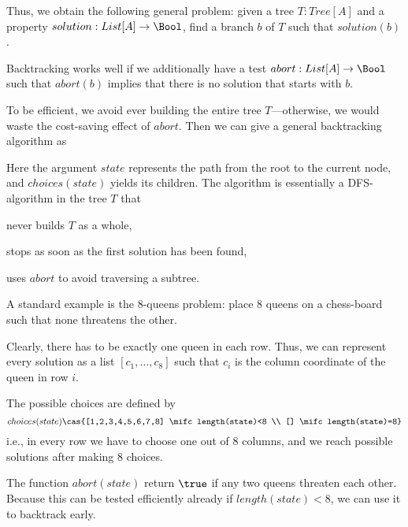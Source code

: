Thus, we obtain the following general problem: given a tree $T:Tree[A]$ and a property $solution:List[A]\to\Bool$, find a branch $b$ of $T$ such that $solution(b)$.

Backtracking works well if we additionally have a test $abort:List[A]\to\Bool$ such that $abort(b)$ implies that there is no solution that starts with $b$.

To be efficient, we avoid ever building the entire tree $T$---otherwise, we would waste the cost-saving effect of $abort$.
Then we can give a general backtracking algorithm as
\begin{acode}
\end{acode}

Here the argument $state$ represents the path from the root to the current node, and $choices(state)$ yields its children.
The algorithm is essentially a DFS-algorithm in the tree $T$ that
\begin{compactitem}
 \item never builds $T$ as a whole,
 \item stops as soon as the first solution has been found,
 \item uses $abort$ to avoid traversing a subtree.
\end{compactitem}

\begin{example}
A standard example is the $8$-queens problem: place $8$ queens on a chess-board such that none threatens the other.

Clearly, there has to be exactly one queen in each row.
Thus, we can represent every solution as a list $[c_1,\ldots,c_8]$ such that $c_i$ is the column coordinate of the queen in row $i$.

The possible choices are defined by
\[choices(state) \cas{[1,2,3,4,5,6,7,8] \mifc length(state)<8 \\ [] \mifc length(state)=8}\]
i.e., in every row we have to choose one out of $8$ columns, and we reach possible solutions after making $8$ choices.

The function $abort(state)$ return $\true$ if any two queens threaten each other.
Because this can be tested efficiently already if $length(state)<8$, we can use it to backtrack early.
\end{example}

